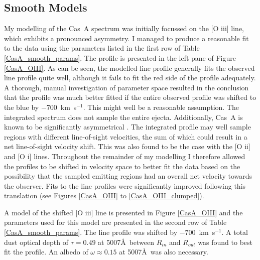 \subsection{Smooth Models}

My modelling of the Cas~A spectrum was initially focussed on the [O {\sc iii}] line, which exhibits a pronounced asymmetry.  I managed to produce a reasonable fit to the data using the parameters listed in the first row of Table \ref{CasA_smooth_params}.  The profile is presented in the left pane of Figure \ref{CasA_OIII}.  As can be seen,  the modelled line profile generally fits the observed line profile quite well, although it fails to fit the red side of the profile adequately.  A thorough, manual investigation of parameter space resulted in the conclusion that the profile was much better fitted if the entire observed profile was shifted to the blue by $-700$~km~s$^{-1}$.  This might well be a reasonable assumption.  The integrated spectrum does not sample the entire ejecta.  Additionally, Cas~A is known to be significantly asymmetrical \citep{Rest2011}.  The integrated profile may well sample regions with different line-of-sight velocities, the sum of which could result in a net line-of-sight velocity shift.  This was also found to be the case with the [O {\sc ii}] and [O {\sc i}] lines.  Throughout the remainder of my modelling I therefore allowed the profiles to be shifted in velocity space to better fit the data based on the possibility that the sampled emitting regions had an overall net velocity towards the observer.  Fits to the line profiles were significantly improved following this translation (see Figures \ref{CasA_OIII} to \ref{CasA_OIII_clumped}).

A model of the shifted [O {\sc iii}] line is presented in Figure \ref{CasA_OIII} and the parameters used for this model are presented in the second row of Table \ref{CasA_smooth_params}.  The line profile was shifted by $-700$~km~s$^{-1}$.  A total dust optical depth of $\tau=0.49$ at 5007\AA\ between $R_{in}$ and $R_{out}$ was found to best fit the profile.  An albedo of $\omega\approx0.15$ at 5007\AA\ was also necessary.

